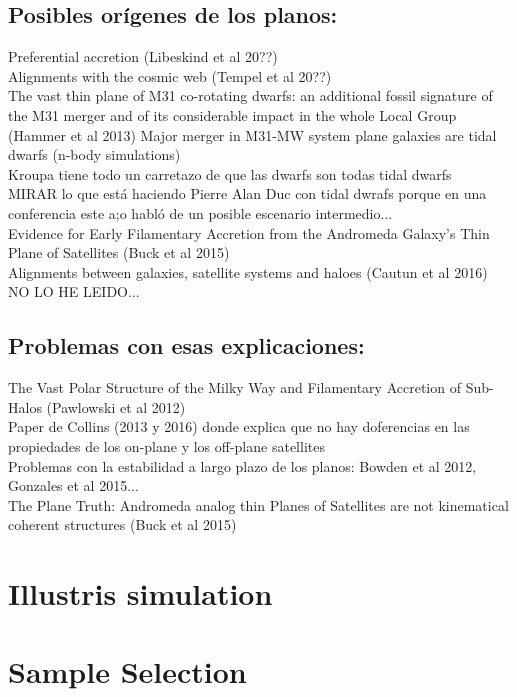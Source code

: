 \documentclass{emulateapj}
\begin{document}
\subsection{Posibles or\'igenes de los planos:}
\noindent Preferential accretion (Libeskind et al 20??)\\
Alignments with the cosmic web (Tempel et al 20??)\\
The vast thin plane of M31 co-rotating dwarfs: an additional fossil
signature of the M31 merger and of its considerable impact in the
whole Local Group (Hammer et al 2013) Major merger in M31-MW system
plane galaxies are tidal dwarfs (n-body simulations)\\
Kroupa tiene todo un carretazo de que las dwarfs son todas tidal
dwarfs\\
MIRAR lo que est\'a haciendo Pierre Alan Duc con tidal dwrafs porque en
una conferencia este a;o habl\'o de un posible escenario
intermedio...\\
Evidence for Early Filamentary Accretion from the Andromeda Galaxy's
Thin Plane of Satellites (Buck et al 2015)\\
Alignments between galaxies, satellite systems and haloes (Cautun et al
2016) NO LO HE LEIDO...

\subsection{Problemas con esas explicaciones:}
The Vast Polar Structure of the Milky Way and Filamentary Accretion of
Sub-Halos (Pawlowski et al 2012)\\
Paper de Collins (2013 y 2016) donde explica que no hay doferencias en
las propiedades de los on-plane y los off-plane satellites\\
Problemas con la estabilidad a largo plazo de los planos: Bowden et al
2012, Gonzales et al 2015...\\
The Plane Truth: Andromeda analog thin Planes of Satellites are not
kinematical coherent structures (Buck et al 2015)\\

 


\section{Illustris simulation}

\section{Sample Selection}
\end{document}
